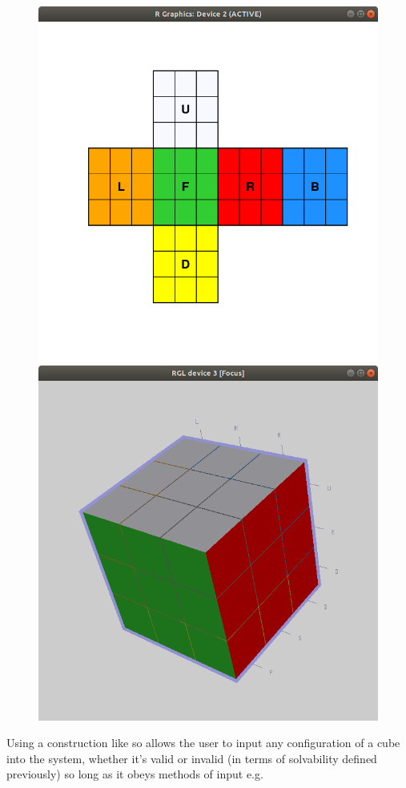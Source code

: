 \documentclass{article}
\begin{document}
\begin{figure}[h]
	\centering
	\includegraphics[scale=.4]{2dcube.png}
    \includegraphics[scale=.4]{3dcube.png}
\end{figure}
\newpage
Using a construction like so allows the user to input any configuration of a cube into the system, whether it's valid or invalid (in terms of solvability defined previously) so long as it obeys methods of input e.g.
\end{document}
